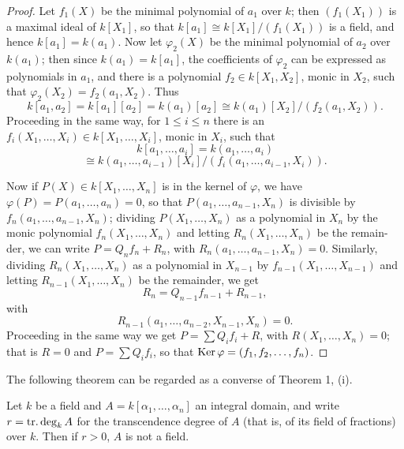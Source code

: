 \begin{proof}
Let $f_1(X)$ be the minimal polynomial of $a_1$ over $k$; then $(f_1(X_1))$ is a
maximal ideal of $k[X_1]$, so that $k[a_1] \cong k[X_1]/(f_1(X_1))$ is a field, and hence
$k[a_1] = k(a_1)$. Now let $\varphi_2(X)$ be the minimal polynomial of $a_2$ over $k(a_1)$;
then since $k(a_1) = k[a_1]$, the coefficients of $\varphi_2$ can be expressed as
polynomials in $a_1$, and there is a polynomial $f_2 \in k[X_1, X_2]$, monic in $X_2$,
such that $\varphi_2(X_2) = f_2(a_1, X_2)$. Thus
\[
  k[a_1, a_2] = k[a_1][a_2] = k(a_1)[a_2] \cong k(a_1)[X_2]/(f_2(a_1, X_2)).
\]
Proceeding in the same way, for $1 \le i \le n$ there is an
$f_i(X_1, \ldots, X_i) \in k[X_1, \ldots, X_i]$, monic in $X_i$, such that
\[
  k[a_1, \ldots, a_i] = k(a_1, \ldots, a_i)
\]
\[
  \cong k(a_1, \ldots, a_{i-1})[X_i]/(f_i(a_1, \ldots, a_{i-1}, X_i)).
\]

Now if $P(X) \in k[X_1, \ldots, X_n]$ is in the kernel of $\varphi$, we have $\varphi(P) =
P(a_1, \ldots, a_n) = 0$, so that $P(a_1, \ldots, a_{n-1}, X_n)$ is divisible by $f_n(a_1, \ldots,
a_{n-1}, X_n)$; dividing $P(X_1, \ldots, X_n)$ as a polynomial in $X_n$ by the
monic polynomial $f_n(X_1, \ldots, X_n)$ and letting $R_n(X_1, \ldots, X_n)$ be the remain-
der, we can write $P = Q_n f_n + R_n$, with $R_n(a_1, \ldots, a_{n-1}, X_n) = 0$. Similarly,
dividing $R_n(X_1, \ldots, X_n)$ as a polynomial in $X_{n-1}$ by $f_{n-1}(X_1, \ldots, X_{n-1})$ and
letting $R_{n-1}(X_1, \ldots, X_n)$ be the remainder, we get
\[
  R_n = Q_{n-1}f_{n-1} + R_{n-1},
\]
with
\[
  R_{n-1}(a_1, \ldots, a_{n-2}, X_{n-1}, X_n) = 0.
\]
Proceeding in the same way we get $P = \sum Q_i f_i + R$, with $R(X_1, \ldots, X_n) = 0$;
that is $R = 0$ and $P = \sum Q_i f_i$, so that $\operatorname{Ker} \varphi = (f_1, f_2, \ldots, f_n)$.
\end{proof}

The following theorem can be regarded as a converse of Theorem 1, (i).

\begin{theorem}\label{thm:5.2}
Let $k$ be a field and $A = k[\alpha_1, \ldots, \alpha_n]$ an integral domain, and
write $r = \operatorname{tr.deg}_k A$ for the transcendence degree of $A$ (that is, of its field of
fractions) over $k$. Then if $r > 0$, $A$ is not a field.
\end{theorem}

